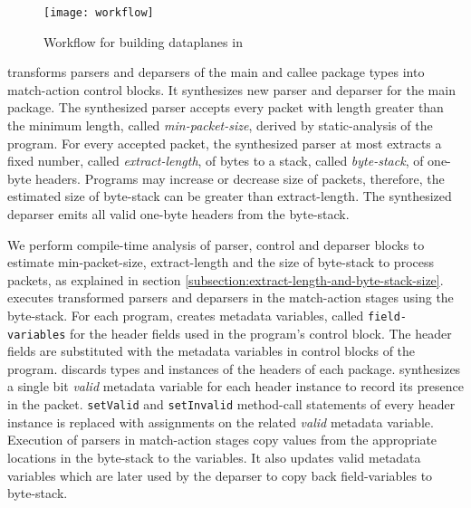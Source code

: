 \documentclass[letterpaper,twocolumn,10pt]{article}
\begin{document}
\begin{figure}[tbh]
  \centering
  \texttt{[image: workflow]}
  \caption{Workflow for building dataplanes in \ulang}
  \label{fig:workflow}
\end{figure}
\ucomp transforms parsers and deparsers of the main and callee package types into match-action control blocks.
It synthesizes new parser and deparser for the main package.
The synthesized parser accepts every packet with length greater than the minimum length, called \emph{min-packet-size}, derived by static-analysis of the program.
For every accepted packet, the synthesized parser at most extracts a fixed number, called \emph{extract-length}, of bytes to a stack, called \emph{byte-stack}, of one-byte headers.
Programs may increase or decrease size of packets, therefore, the estimated size of byte-stack can be greater than extract-length.
The synthesized deparser emits all valid one-byte headers from the byte-stack.


We perform compile-time analysis of parser, control and deparser blocks to estimate min-packet-size, extract-length and the size of byte-stack to process packets, as explained in section \ref{subsection:extract-length-and-byte-stack-size}. 
\ucomp executes transformed parsers and deparsers in the match-action stages using the byte-stack.
For each program, \ucomp creates metadata variables, called \texttt{field-variables} for the header fields used in the program's control block.
The header fields are substituted with the metadata variables in control blocks of the program.
\ucomp discards types and instances of the headers of each package.
\ucomp synthesizes a single bit \emph{valid} metadata variable for each header instance to record its presence in the packet.
\texttt{setValid} and \texttt{setInvalid} method-call statements of every header instance is replaced with assignments on the related \emph{valid} metadata variable.
Execution of parsers in match-action stages copy values from the appropriate locations in the byte-stack to the variables.
It also updates valid metadata variables which are later used by the deparser to copy back field-variables to byte-stack.


\end{document}
